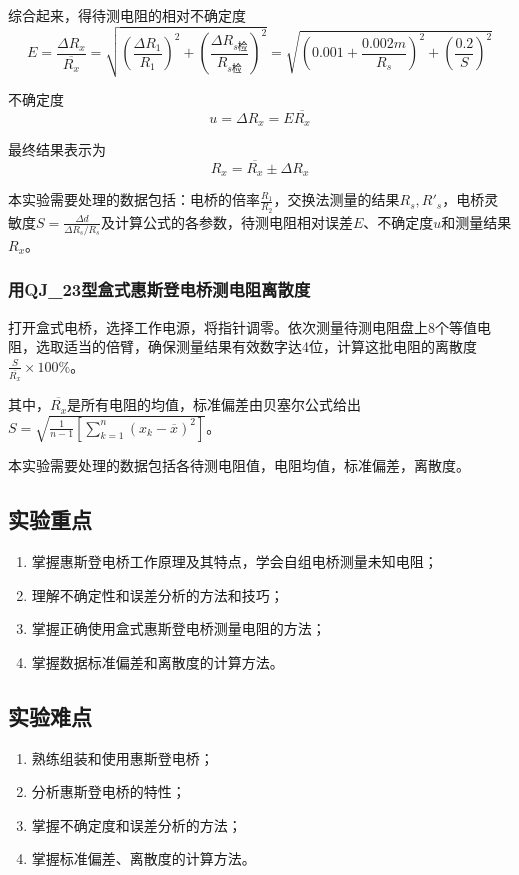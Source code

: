 \documentclass[]{../../templates/Report}%
\begin{document}
综合起来，得待测电阻的相对不确定度
\[E = \frac{\Delta R_x}{\overline{R_x}} = \sqrt{ \left(\frac{\Delta R_1}{R_1}\right)^2 + \left(\frac{\Delta R_{s\text{检}}}{R_{s\text{检}}}\right)^2} = \sqrt{\left(0.001+ \frac{0.002m}{R_s}\right)^2 + \left(\frac{0.2}{S}\right)^2}\]

不确定度
\[u = \Delta R_x = E \overline{R_x}\]

最终结果表示为
\[R_x = \overline{R_x} \pm \Delta R_x\]

本实验需要处理的数据包括：电桥的倍率$\frac{R_1}{R_2}$，交换法测量的结果$R_s,R'_s$，电桥灵敏度$S = \frac{\Delta d}{\Delta R_s /R_s}$及计算公式的各参数，待测电阻相对误差$E$、不确定度$u$和测量结果$R_x$。
\subsubsection{用QJ\_23型盒式惠斯登电桥测电阻离散度}

打开盒式电桥，选择工作电源，将指针调零。依次测量待测电阻盘上8个等值电阻，选取适当的倍臂，确保测量结果有效数字达4位，计算这批电阻的离散度$\frac{S}{\overline{R_x}} \times 100\%$。

其中，$\overline{R_x}$是所有电阻的均值，标准偏差由贝塞尔公式给出$S = \sqrt{\frac{1}{n-1} \left[\sum_{k=1}^{n}(x_k - \overline{x})^2\right]}$。

本实验需要处理的数据包括各待测电阻值，电阻均值，标准偏差，离散度。


\subsection{实验重点}
\begin{enumerate}
    \item 掌握惠斯登电桥工作原理及其特点，学会自组电桥测量未知电阻；
    \item 理解不确定性和误差分析的方法和技巧；
    \item 掌握正确使用盒式惠斯登电桥测量电阻的方法；
    \item 掌握数据标准偏差和离散度的计算方法。
\end{enumerate}
\subsection{实验难点}
\begin{enumerate}
    \item 熟练组装和使用惠斯登电桥；
    \item 分析惠斯登电桥的特性；
    \item 掌握不确定度和误差分析的方法；
    \item 掌握标准偏差、离散度的计算方法。
\end{enumerate}
\end{document}
